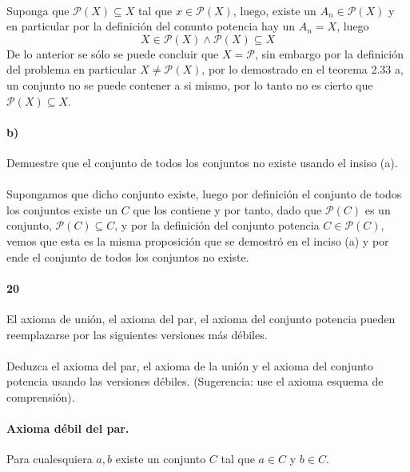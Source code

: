 \documentclass{article}
\begin{document}
	\paragraph{} Suponga que $\mathcal{P}(X) \subseteq X$ tal que $x \in \mathcal{P}(X)$, luego, existe un $A_n \in \mathcal{P}(X)$ y en particular por la definición del conunto potencia hay un $A_n = X$, luego
	$$X \in \mathcal{P}(X) \land \mathcal{P}(X) \subseteq X$$
	De lo anterior se sólo se puede concluir que $X=\mathcal{P}$, sin embargo por la definición del problema en particular $X \neq \mathcal{P}(X)$, por lo demostrado en el teorema 2.33 a, un conjunto no se puede contener a si mismo, por lo tanto no es cierto que $\mathcal{P}(X) \subseteq X$.
	\paragraph{b)} Demuestre que el conjunto de todos los conjuntos no existe usando el insiso (a).
	\paragraph{}Supongamos que dicho conjunto existe, luego por definición el conjunto de todos los conjuntos existe un $C$ que los contiene y por tanto, dado que $\mathcal{P}(C)$ es un conjunto, $\mathcal{P}(C) \subseteq C$, y por la definición del conjunto potencia $C \in \mathcal{P}(C)$, vemos que esta es la misma proposición que se demostró en el inciso (a) y por ende el conjunto de todos los conjuntos no existe.
	\paragraph{20} El axioma de unión, el axioma del par, el axioma del conjunto potencia pueden reemplazarse por las siguientes versiones más débiles.
	\paragraph{} Deduzca el axioma del par, el axioma de la unión y el axioma del conjunto potencia usando las versiones débiles. (Sugerencia: use el axioma esquema de comprensión).
	\paragraph{Axioma débil del par.} Para cualesquiera $a, b$ existe un conjunto $C$ tal que $a \in C$ y $b \in C$.
\end{document}
